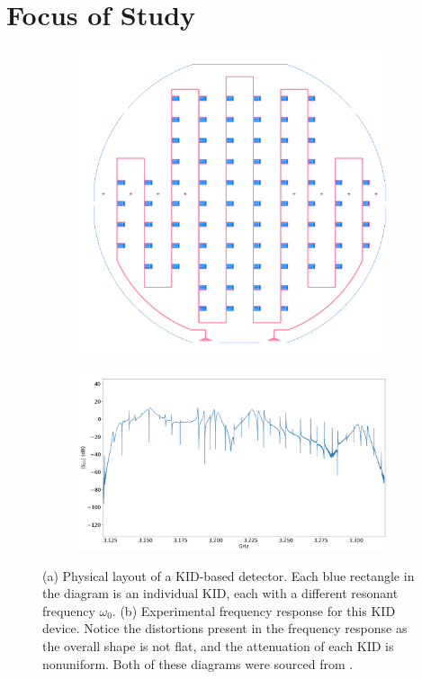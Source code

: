 \section{Focus of Study}
\label{study-focus}

\begin{figure}
	\centering
	\begin{subfigure}{0.3\textwidth}
		\includegraphics[width=\textwidth]{images/feedline.png}
		\caption{}
		\label{feedline}
	\end{subfigure}
	\hspace{1cm}
	\begin{subfigure}{0.6\textwidth}
		\includegraphics[width=\textwidth]{images/feedline-frequency.png}
		\caption{}
		\label{feedline-freq}
	\end{subfigure}
	\caption{(a) Physical layout of a KID-based detector. Each blue rectangle in the diagram is an individual
	KID, each with a different resonant frequency \( \omega_0 \). (b) Experimental frequency response for
	this KID device. Notice the distortions present in the frequency response as the overall shape is not
	flat, and the attenuation of each KID is nonuniform. Both of these diagrams were sourced from
	\cite{changSuperCDMSHVeVRun}.}
\end{figure}

